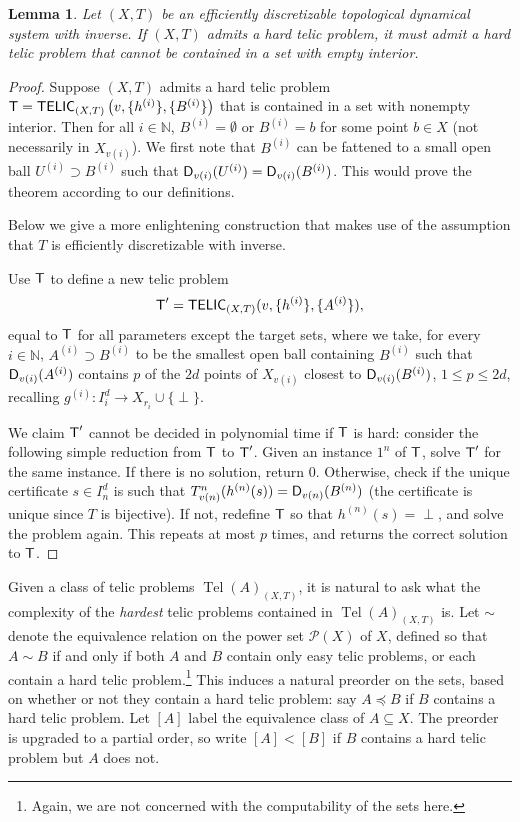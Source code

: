 \documentclass{amsart}
\theoremstyle{theorem}
\newtheorem{lemma}[theorem]{Lemma}
\theoremstyle{remark}
\numberwithin{equation}{section}
\DeclareMathOperator{\Tel}{Tel}
\newcommand{\NN}{\mathbb{N}}
\newcommand{\ccD}{\textsf{\upshape D}}
\newcommand{\ccT}{\textsf{\upshape T}}
\newcommand{\ccTELIC}{\textsf{\upshape TELIC}}
\newcommand{\cP}{\mathcal{P}}
\begin{document}
\begin{lemma}\label{lemHT->Open}
Let $(X, T)$ be an efficiently discretizable topological dynamical system with inverse. If $(X, T)$ admits a hard telic problem, it must admit a hard telic problem that cannot be contained in a set with empty interior.
\end{lemma}
\begin{proof}
Suppose $(X, T)$ admits a hard telic problem $\ccT=\ccTELIC_{(X, T)}\left(v,\{h^{(i)}\},\{B^{(i)}\}\right)$ that is contained in a set with nonempty interior. Then for all $i \in \NN$, $B^{(i)} = \emptyset$ or $B^{(i)} = b$ for some point $b \in X$ (not necessarily in $X_{v(i)}$). We first note that $B^{(i)}$ can be fattened to a small open ball $U^{(i)} \supset B^{(i)}$ such that $\ccD_{v(i)}(U^{(i)}) = \ccD_{v(i)}(B^{(i)})$. This would prove the theorem according to our definitions.

Below we give a more enlightening construction that makes use of the assumption that $T$ is efficiently discretizable with inverse.

Use $\ccT$ to define a new telic problem
\[
\ccT'=\ccTELIC_{(X, T)}(v,\{h^{(i)}\},\{A^{(i)}\}),
\]
equal to $\ccT$ for all parameters except the target sets, where we take, for every $i \in \NN$, $A^{(i)} \supset B^{(i)}$ to be the smallest open ball containing $B^{(i)}$ such that $\ccD_{v(i)}(A^{(i)})$ contains $p$ of the $2d$ points of $X_{v(i)}$ closest to $\ccD_{v(i)}(B^{(i)})$, $1 \leq p \leq 2d$, recalling $g^{(i)}:I^d_i\rightarrow X_{r_i} \cup \{\perp\}$.

We claim $\ccT'$ cannot be decided in polynomial time if $\ccT$ is hard: consider the following simple reduction from $\ccT$ to $\ccT'$. Given an instance $1^n$ of $\ccT$, solve $\ccT'$ for the same instance. If there is no solution, return $0$. Otherwise, check if the unique certificate $s \in I_n^d$ is such that $T^{n}_{v(n)}(h^{(n)}(s)) = \ccD_{v(n)}(B^{(n)})$ (the certificate is unique since $T$ is bijective). If not, redefine $\ccT$ so that $h^{(n)}(s) = \perp$, and solve the problem again. This repeats at most $p$ times, and returns the correct solution to $\ccT$.
\end{proof}

Given a class of telic problems $\Tel(A)_{(X, T)}$, it is natural to ask what the complexity of the \emph{hardest} telic problems contained in $\Tel(A)_{(X, T)}$ is.
Let $\sim$ denote the equivalence relation on the power set $\cP(X)$ of $X$, defined so that $A \sim B$ if and only if both $A$ and $B$ contain only easy telic problems, or each contain a hard telic problem.\footnote{Again, we are not concerned with the computability of the sets here.}  This induces a natural preorder on the sets, based on whether or not they contain a hard telic problem: say $A \preceq B$ if $B$ contains a hard telic problem.
Let $[A]$ label the equivalence class of $A \subseteq X$.
The preorder is upgraded to a partial order, so write $[A]<[B]$ if $B$ contains a hard telic problem but $A$ does not.
\end{document}
